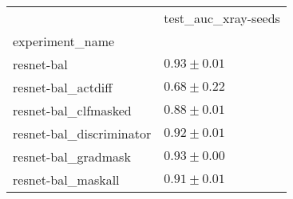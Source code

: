 \begin{tabular}{ll}
\toprule
{} & test_auc_xray-seeds \\
experiment_name          &                     \\
\midrule
resnet-bal               &       $0.93\pm0.01$ \\
resnet-bal_actdiff       &       $0.68\pm0.22$ \\
resnet-bal_clfmasked     &       $0.88\pm0.01$ \\
resnet-bal_discriminator &       $0.92\pm0.01$ \\
resnet-bal_gradmask      &       $0.93\pm0.00$ \\
resnet-bal_maskall       &       $0.91\pm0.01$ \\
\bottomrule
\end{tabular}
